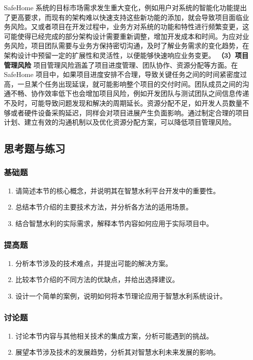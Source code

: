 SafeHome 系统的目标市场需求发生重大变化，例如用户对系统的智能化功能提出了更高要求，而现有的架构难以快速支持这些新功能的添加，就会导致项目面临业务风险。又或者项目在开发过程中，业务方对系统的功能和特性进行频繁变更，这可能使得已经完成的部分架构设计需要重新调整，增加开发成本和时间。为应对业务风险，项目团队需要与业务方保持密切沟通，及时了解业务需求的变化趋势，在架构设计中预留一定的扩展性和灵活性，以便能够快速响应业务变更。 \textbf{（3）项目管理风险} 项目管理风险涵盖了项目进度管理、团队协作、资源分配等方面。在 SafeHome 项目中，如果项目进度安排不合理，导致关键任务之间的时间紧密度过高，一旦某个任务出现延误，就可能影响整个项目的交付时间。团队成员之间的沟通不畅、协作效率低下也会增加项目风险，例如开发团队与测试团队之间信息传递不及时，可能导致问题发现和解决的周期延长。资源分配不足，如开发人员数量不够或者硬件设备采购延迟，同样会对项目进展产生负面影响。通过制定合理的项目计划、建立有效的沟通机制以及优化资源分配方案，可以降低项目管理风险。 \subsection{思考题与练习}\label{ux601dux8003ux9898ux4e0eux7ec3ux4e60} \subsubsection{基础题}\label{ux57faux7840ux9898} \begin{enumerate} \def\labelenumi{\arabic{enumi}.} \item 请简述本节的核心概念，并说明其在智慧水利平台开发中的重要性。 \item 总结本节介绍的主要技术方法，并分析各方法的适用场景。 \item 结合智慧水利的实际需求，解释本节内容如何应用于实际项目中。 \end{enumerate} \subsubsection{提高题}\label{ux63d0ux9ad8ux9898} \begin{enumerate} \def\labelenumi{\arabic{enumi}.} \setcounter{enumi}{3} \item 分析本节涉及的技术难点，并提出可能的解决方案。 \item 比较本节介绍的不同方法的优缺点，并给出选择建议。 \item 设计一个简单的案例，说明如何将本节理论应用于智慧水利系统设计。 \end{enumerate} \subsubsection{讨论题}\label{ux8ba8ux8bbaux9898} \begin{enumerate} \def\labelenumi{\arabic{enumi}.} \setcounter{enumi}{6} \item 讨论本节内容与其他相关技术的集成方案，分析可能遇到的挑战。 \item 展望本节涉及技术的发展趋势，分析其对智慧水利未来发展的影响。 \end{enumerate} 